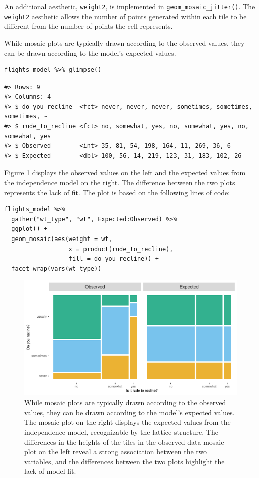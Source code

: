 An additional aesthetic, \texttt{weight2}, is implemented in \texttt{geom\_mosaic\_jitter()}. The \texttt{weight2} aesthetic allows the number of points generated within each tile to be different from the number of points the cell represents.

While mosaic plots are typically drawn according to the observed values, they can be drawn according to the model's expected values.

\begin{verbatim}
flights_model %>% glimpse()
\end{verbatim}

\begin{verbatim}
#> Rows: 9
#> Columns: 4
#> $ do_you_recline  <fct> never, never, never, sometimes, sometimes, sometimes, ~
#> $ rude_to_recline <fct> no, somewhat, yes, no, somewhat, yes, no, somewhat, yes
#> $ Observed        <int> 35, 81, 54, 198, 164, 11, 269, 36, 6
#> $ Expected        <dbl> 100, 56, 14, 219, 123, 31, 183, 102, 26
\end{verbatim}

Figure \ref{fig:model} displays the observed values on the left and the expected values from the independence model on the right. The difference between the two plots represents the lack of fit. The plot is based on the following lines of code:

\begin{verbatim}
flights_model %>% 
  gather("wt_type", "wt", Expected:Observed) %>% 
  ggplot() + 
  geom_mosaic(aes(weight = wt, 
                  x = product(rude_to_recline), 
                  fill = do_you_recline)) +
  facet_wrap(vars(wt_type))
\end{verbatim}

\begin{figure}[h]

{\centering \includegraphics[width=1\linewidth]{jeppson-hofmann_files/figure-latex/model-1} 

}

\caption{While mosaic plots are typically drawn according to the observed values, they can be drawn according to the model's expected values. The mosaic plot on the right displays the expected values from the independence model, recognizable by the lattice structure. The differences in the heights of the tiles in the observed data mosaic plot on the left reveal a strong association between the two variables, and the differences between the two plots highlight the lack of model fit.}\label{fig:model}
\end{figure}

